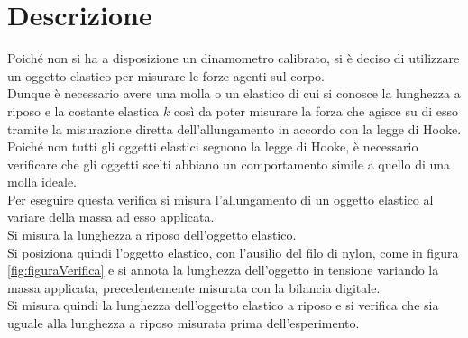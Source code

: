 \section*{Descrizione}

Poiché non si ha a disposizione un dinamometro calibrato, si è deciso di utilizzare un oggetto elastico per misurare le forze agenti sul corpo.\\
Dunque è necessario avere una molla o un elastico di cui si conosce la lunghezza a riposo e la costante elastica $k$ così da poter misurare la forza
 che agisce su di esso tramite la misurazione diretta dell'allungamento in accordo con la legge di Hooke.\\ 
 Poiché non tutti gli oggetti elastici seguono la legge di Hooke, è necessario verificare che gli oggetti scelti abbiano un comportamento 
 simile a quello di una molla ideale.\\
Per eseguire questa verifica si misura l'allungamento di un oggetto elastico al variare della massa ad esso applicata.\\ 
Si misura la lunghezza a riposo dell'oggetto elastico.\\
Si posiziona quindi l'oggetto elastico, con l'ausilio del filo di nylon, come in figura \ref{fig:figuraVerifica} e si annota la lunghezza 
dell'oggetto in tensione variando la massa applicata, precedentemente misurata con la bilancia digitale.\\
Si misura quindi la lunghezza dell'oggetto elastico a riposo e si verifica che sia uguale alla lunghezza a riposo misurata prima dell'esperimento.\\
